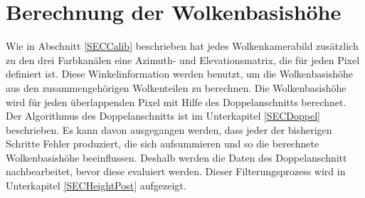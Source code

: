 \documentclass[a4paper,11pt,twoside,german]{article}
\begin{document}
\section{Berechnung der Wolkenbasishöhe}
\label{SECHoehenbestimmung}
Wie in Abschnitt \ref{SECCalib} beschrieben hat jedes Wolkenkamerabild zusätzlich zu den drei Farbkanälen eine Azimuth- und Elevationsmatrix, die für jeden Pixel definiert ist. Diese Winkelinformation werden benutzt, um die Wolkenbasishöhe aus den zusammengehörigen Wolkenteilen zu berechnen. Die Wolkenbasishöhe wird für jeden überlappenden Pixel mit Hilfe des Doppelanschnitts berechnet. Der Algorithmus des Doppelanschnitts ist im Unterkapitel \ref{SECDoppel} beschrieben. Es kann davon ausgegangen werden, dass jeder der bisherigen Schritte Fehler produziert, die sich aufsummieren und so die berechnete Wolkenbasishöhe beeinflussen. Deshalb werden die Daten des Doppelanschnitt nachbearbeitet, bevor diese evaluiert werden. Dieser Filterungsprozess wird in Unterkapitel \ref{SECHeightPost} aufgezeigt.
\end{document}

